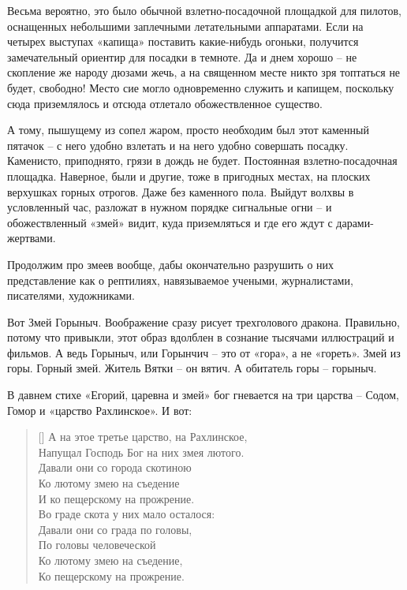Весьма вероятно, это было обычной взлетно-посадоч\-ной площадкой для пилотов, оснащенных небольшими заплечными летательными аппаратами. Если на четырех выступах «капища» поставить какие-нибудь огоньки, получится замечательный ориентир для посадки в темноте. Да и днем хорошо – не скопление же народу дюзами жечь, а на священном месте никто зря топтаться не будет, свободно! Место сие могло одновременно служить и капищем, поскольку сюда приземлялось и отсюда отлетало обожествленное существо.

А тому, пышущему из сопел жаром, просто необходим был этот каменный пятачок – с него удобно взлетать и на него удобно совершать посадку. Каменисто, приподнято, грязи в дождь не будет. Постоянная взлетно-посадочная площадка. Наверное, были и другие, тоже в пригодных местах, на плоских верхушках горных отрогов. Даже без каменного пола. Выйдут волхвы в условленный час, разложат в нужном порядке сигнальные огни – и обожествленный «змей» видит, куда приземляться и где его ждут с дарами-жертвами.

Продолжим про змеев вообще, дабы окончательно разрушить о них представление как о рептилиях, навязываемое учеными, журналистами, писателями, художниками.

Вот Змей Горыныч. Воображение сразу рисует трехголового дракона. Правильно, потому что привыкли, этот образ вдолблен в сознание тысячами иллюстраций и фильмов. А ведь Горыныч, или Горынчич – это от «гора», а не «гореть». Змей из горы. Горный змей. Житель Вятки – он вятич. А обитатель горы – горыныч.

В давнем стихе «Егорий, царевна и змей» бог гневается на три царства – Содом, Гомор и «царство Рахлинское». И вот:

\settowidth{\versewidth}{Напущал Господь Бог на них змея лютого.} 
\begin{verse}[\versewidth]
А на этое третье царство, на Рахлинское,\\
Напущал Господь Бог на них змея лютого.\\
Давали они со города скотиною\\
Ко лютому змею на съедение\\
И ко пещерскому на прожрение.\\
Во граде скота у них мало осталося:\\
Давали они со града по головы,\\
По головы человеческой\\
Ко лютому змею на съедение,\\
Ко пещерскому на прожрение.
\end{verse}

